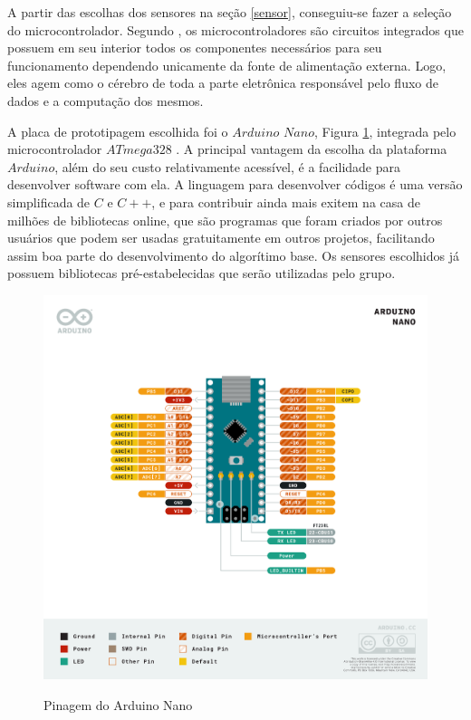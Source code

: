 \documentclass[acronym,symbols]{fei}
\begin{document}
A partir das escolhas dos sensores na seção \ref{sensor}, conseguiu-se fazer a seleção do microcontrolador. Segundo \textcite{kerschbaumer2013microcontroladores}, os microcontroladores são circuitos integrados que possuem em seu interior todos os componentes necessários para seu funcionamento dependendo unicamente da fonte de alimentação externa. Logo, eles agem como o cérebro de toda a parte eletrônica responsável pelo fluxo de dados e a computação dos mesmos.

A placa de prototipagem escolhida foi o $Arduino$ $Nano$, Figura \ref{fig:pinagem arduino}, integrada pelo microcontrolador $ATmega328$ \cite{UNO}. A principal vantagem da escolha da plataforma $Arduino$, além do seu custo relativamente acessível, é a facilidade para desenvolver software com ela. A linguagem para desenvolver códigos é uma versão simplificada de $C$ e $C++$, e para contribuir ainda mais exitem na casa de milhões de bibliotecas online, que são programas que foram criados por outros usuários que podem ser usadas gratuitamente em outros projetos, facilitando assim boa parte do desenvolvimento do algorítimo base. Os sensores escolhidos já possuem bibliotecas pré-estabelecidas que serão utilizadas pelo grupo.

\begin{figure}[!htb]
\centering
    \caption{Pinagem do Arduino Nano}
    \includegraphics[width=0.85\linewidth]{Imagens/Pinagem Arduino Nano.png}
    \label{fig:pinagem arduino}
\end{figure}
\end{document}
